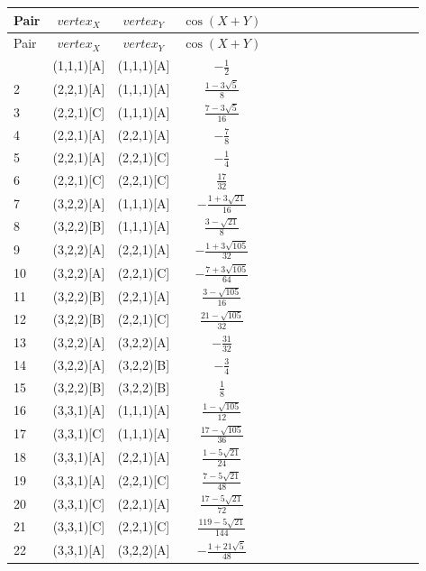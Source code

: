 \documentclass[11pt]{article}
\begin{document}
\begin{longtable}{ | p{1cm}| *{15}{c|} }
\hline
Pair & $vertex_X$ & $vertex_Y$ & $\cos(X+Y)$ \\
\hline\endhead
\hline
Pair & $vertex_X$ & $vertex_Y$ & $\cos(X+Y)$ \\
\hline\endfoot
1 & (1,1,1)[A] & (1,1,1)[A] & $-\frac{1}{2}$\\ %
2 & (2,2,1)[A] & (1,1,1)[A] & $\frac{1-3\sqrt{5}}{8}$\\ %
3 & (2,2,1)[C] & (1,1,1)[A] & $\frac{7-3\sqrt{5}}{16}$\\ %
4 & (2,2,1)[A] & (2,2,1)[A] & $-\frac{7}{8}$\\ %
5 & (2,2,1)[A] & (2,2,1)[C] & $-\frac{1}{4}$\\ %
6 & (2,2,1)[C] & (2,2,1)[C] & $\frac{17}{32}$\\ %
7 & (3,2,2)[A] & (1,1,1)[A] & $-\frac{1+3\sqrt{21}}{16}$\\ %
8 & (3,2,2)[B] & (1,1,1)[A] & $\frac{3-\sqrt{21}}{8}$\\ %
9 & (3,2,2)[A] & (2,2,1)[A] & $-\frac{1+3\sqrt{105}}{32}$\\ %
10 & (3,2,2)[A] & (2,2,1)[C] & $-\frac{7+3\sqrt{105}}{64}$\\ %
11 & (3,2,2)[B] & (2,2,1)[A] & $\frac{3-\sqrt{105}}{16}$\\ %
12 & (3,2,2)[B] & (2,2,1)[C] & $\frac{21-\sqrt{105}}{32}$\\ %
13 & (3,2,2)[A] & (3,2,2)[A] & $-\frac{31}{32}$\\ %
14 & (3,2,2)[A] & (3,2,2)[B] & $-\frac{3}{4}$\\ %
15 & (3,2,2)[B] & (3,2,2)[B] & $\frac{1}{8}$\\ %
16 & (3,3,1)[A] & (1,1,1)[A] & $\frac{1-\sqrt{105}}{12}$\\ %
17 & (3,3,1)[C] & (1,1,1)[A] & $\frac{17-\sqrt{105}}{36}$\\ %
18 & (3,3,1)[A] & (2,2,1)[A] & $\frac{1-5\sqrt{21}}{24}$\\ %
19 & (3,3,1)[A] & (2,2,1)[C] & $\frac{7-5\sqrt{21}}{48}$\\ %
20 & (3,3,1)[C] & (2,2,1)[A] & $\frac{17-5\sqrt{21}}{72}$\\ %
21 & (3,3,1)[C] & (2,2,1)[C] & $\frac{119-5\sqrt{21}}{144}$\\ %
22 & (3,3,1)[A] & (3,2,2)[A] & $-\frac{1+21\sqrt{5}}{48}$\\ %

\end{longtable}
\end{document}
